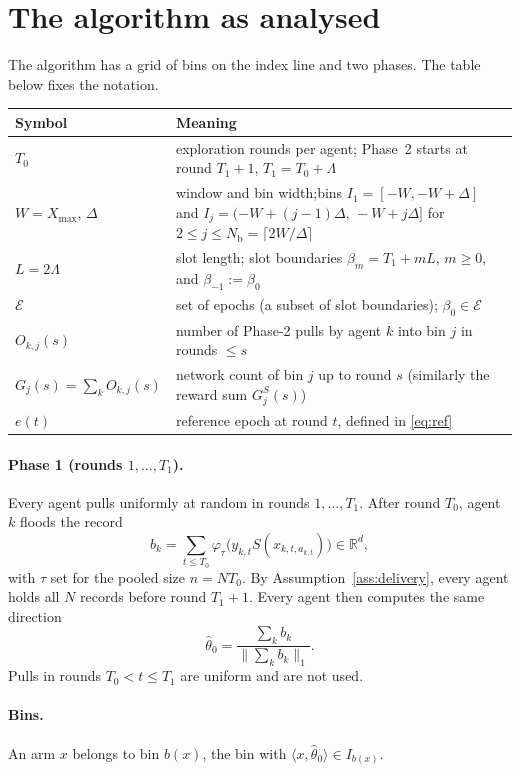 \documentclass[11pt]{article}
\theoremstyle{definition}
\newcommand{\R}{\mathbb{R}}
\newcommand{\Nb}{N_{\mathrm b}}
\newcommand{\Xmax}{X_{\max}}
\newcommand{\cE}{\mathcal{E}}
\begin{document}
\section{The algorithm as analysed}\label{sec:alg}

The algorithm has a grid of bins on the index line and two phases. The table below fixes the notation.

\begin{center}
\begin{tabular}{@{}lp{}@{}}
\toprule
Symbol & Meaning \\ \midrule
$T_0$ & exploration rounds per agent; Phase~2 starts at round $T_1+1$, $T_1=T_0+\Lambda$\\
$W=\Xmax$, $\Delta$ & window and bin width;\newline bins $I_1=[-W,-W+\Delta]$ and
$I_j=(-W+(j-1)\Delta,\,-W+j\Delta]$ for $2\le j\le\Nb=\lceil2W/\Delta\rceil$\\
$L=2\Lambda$ & slot length; slot boundaries $\beta_m=T_1+mL$, $m\ge0$, and $\beta_{-1}:=\beta_0$\\
$\cE$ & set of epochs (a subset of slot boundaries); $\beta_0\in\cE$\\
$O_{k,j}(s)$ & number of Phase-2 pulls by agent $k$ into bin $j$ in rounds $\le s$\\
$G_j(s)=\sum_kO_{k,j}(s)$ & network count of bin $j$ up to round $s$ (similarly the reward sum $G^S_j(s)$)\\
$e(t)$ & reference epoch at round $t$, defined in \eqref{eq:ref}\\
\bottomrule
\end{tabular}
\end{center}

\paragraph{Phase 1 (rounds $1,\dots,T_1$).} Every agent pulls uniformly at random in rounds $1,\dots,T_1$. After round
$T_0$, agent $k$ floods the record
\[
b_k=\sum_{t\le T_0}\varphi_\tau\big(y_{k,t}S(x_{k,t,a_{k,t}})\big)\in\R^d,
\]
with $\tau$ set for the pooled size $n=NT_0$. By Assumption~\ref{ass:delivery}, every agent holds all $N$ records
before round $T_1+1$. Every agent then computes the same direction
\[
\hat\theta_0=\frac{\sum_kb_k}{\|\sum_kb_k\|_1}.
\]
Pulls in rounds $T_0<t\le T_1$ are uniform and are not used.

\paragraph{Bins.} An arm $x$ belongs to bin $b(x)$, the bin with $\langle x,\hat\theta_0\rangle\in I_{b(x)}$.
\end{document}
